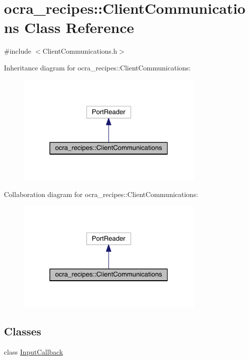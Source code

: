 \hypertarget{classocra__recipes_1_1ClientCommunications}{}\section{ocra\+\_\+recipes\+:\+:Client\+Communications Class Reference}
\label{classocra__recipes_1_1ClientCommunications}


{\ttfamily \#include $<$Client\+Communications.\+h$>$}



Inheritance diagram for ocra\+\_\+recipes\+:\+:Client\+Communications\+:\nopagebreak
\begin{figure}[H]
\begin{center}
\leavevmode
\includegraphics[width=259pt]{d5/d62/classocra__recipes_1_1ClientCommunications__inherit__graph}
\end{center}
\end{figure}


Collaboration diagram for ocra\+\_\+recipes\+:\+:Client\+Communications\+:\nopagebreak
\begin{figure}[H]
\begin{center}
\leavevmode
\includegraphics[width=259pt]{d9/dd7/classocra__recipes_1_1ClientCommunications__coll__graph}
\end{center}
\end{figure}
\subsection*{Classes}
\begin{DoxyCompactItemize}
\item 
class \hyperlink{classocra__recipes_1_1ClientCommunications_1_1InputCallback}{Input\+Callback}
\end{DoxyCompactItemize}
